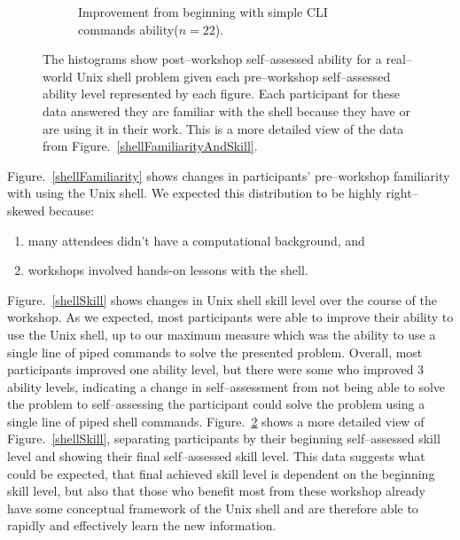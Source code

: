 \documentclass[10pt, twocolumn]{article}
\begin{document}
\begin{figure}[t]
\begin{subfigure}[c]{2.1in}
    	\caption{
    	Improvement from beginning with simple CLI commands ability($n=22$).
    	}
    	\label{shellDetailSkill3}
    \end{subfigure}
	\caption{
	The histograms show post--workshop self--assessed ability for a real--world Unix shell problem given each pre--workshop self--assessed ability level represented by each figure. Each participant for these data answered they are familiar with the shell because they have or are using it in their work. This is a more detailed view of the data from Figure.~\ref{shellFamiliarityAndSkill}.
	}
	\label{shellDetailSkill}
\end{figure}

	Figure.~\ref{shellFamiliarity} shows changes in participants' pre--workshop familiarity with using the Unix shell.
	We expected this distribution to be highly right--skewed because:
	
	\begin{enumerate}
		\item 
		many attendees didn't have a computational background, and
		
		\item 
		workshops involved hands-on lessons with the shell.
	\end{enumerate}
	
	Figure.~\ref{shellSkill} shows changes in Unix shell skill level over the course of the workshop.
	As we expected, most participants were able to improve their ability to use the Unix shell,
	up to our maximum measure
	which was the ability to use a single line of piped commands to solve the presented problem.
	Overall, most participants improved one ability level,
	but there were some who improved 3 ability levels,
	indicating a change in self--assessment from not being able to solve the problem
	to self--assessing the participant could solve the problem using a single line of piped shell commands.
	Figure.~\ref{shellDetailSkill} shows a more detailed view of Figure.~\ref{shellSkill},
	separating participants by their beginning self--assessed skill level
	and showing their final self--assessed skill level.
	This data suggests what could be expected, 
	that final achieved skill level is dependent on the beginning skill level,
	but also that those who benefit most from these workshop
	already have some conceptual framework of the Unix shell
	and are therefore able to rapidly and effectively learn
	the new information.
	
\end{document}
